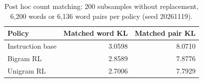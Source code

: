 \begin{table}[htbp]
\centering\small
\caption{Post hoc count matching: 200 subsamples without replacement, 6,200 words or 6,136 word pairs per policy (seed 20261119).}\label{tab:passage-counts}
\begin{tabular}{@{}lrr@{}}
\toprule
Policy & Matched word KL & Matched pair KL\\
\midrule
Instruction base & 3.0598 & 8.0710\\
Bigram RL & 2.8589 & 7.8776\\
Unigram RL & 2.7006 & 7.7929\\
\bottomrule
\end{tabular}
\end{table}
